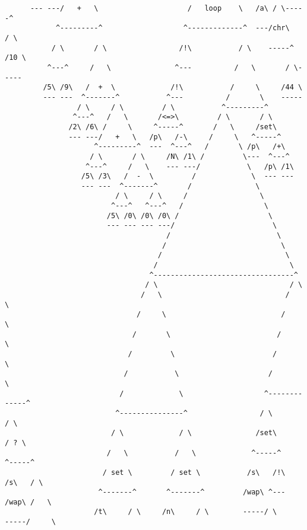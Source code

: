 \documentclass[aip,jcp,reprint,footinbib]{revtex4-1}
\begin{document}
\begin{lstlisting}
      --- ---/   +   \                     /   loop    \   /a\ / \-----^
            ^---------^                   ^-------------^  ---/chr\   / \
           / \       / \                 /!\           / \    -----^ /10 \
          ^---^     /   \               ^---          /   \       / \-----
         /5\ /9\   /  +  \             /!\           /     \     /44 \
         --- ---  ^-------^           ^---          /       \    -----
                 / \     / \         / \           ^---------^
                ^---^   /   \       /<=>\         / \       / \
               /2\ /6\ /     \     ^-----^       /   \     /set\
               --- ---/   +   \   /p\   /-\     /     \   ^-----^
                     ^---------^  ---  ^---^   /       \ /p\   /+\
                    / \       / \     /N\ /1\ /         \---  ^---^
                   ^---^     /   \    --- ---/           \   /p\ /1\
                  /5\ /3\   /  -  \         /             \  --- ---
                  --- ---  ^-------^       /               \
                          / \     / \     /                 \
                         ^---^   ^---^   /                   \
                        /5\ /0\ /0\ /0\ /                     \
                        --- --- --- ---/                       \
                                      /                         \
                                     /                           \
                                    /                             \
                                   /                               \
                                  ^---------------------------------^
                                 / \                               / \
                                /   \                             /   \
                               /     \                           /     \
                              /       \                         /       \
                             /         \                       /         \
                            /           \                     /           \
                           /             \                   ^-------------^
                          ^---------------^                 / \           / \
                         / \             / \               /set\         / ? \
                        /   \           /   \             ^-----^       ^-----^
                       / set \         / set \           /s\   /!\     /s\   / \
                      ^-------^       ^-------^         /wap\ ^---    /wap\ /   \
                     /t\     / \     /n\     / \        -----/ \      -----/     \

\end{lstlisting}
\end{document}
